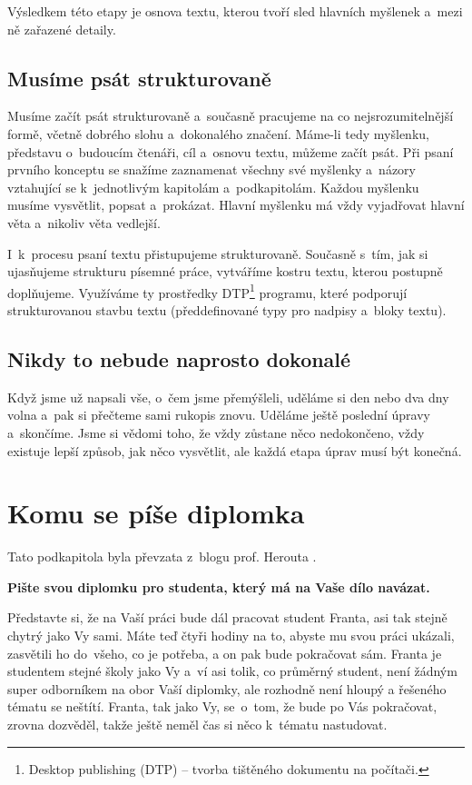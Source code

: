 Výsledkem této etapy je osnova textu, kterou tvoří sled hlavních myšlenek a~mezi ně zařazené detaily.

\subsection*{Musíme psát strukturovaně} 
Musíme začít psát strukturovaně a~současně pracujeme na co nejsrozumitelnější formě, včetně dobrého slohu a~dokonalého značení. 
Máme-li tedy myšlenku, představu o~budoucím čtenáři, cíl a~osnovu textu, můžeme začít psát. Při psaní prvního konceptu se snažíme zaznamenat všechny své myšlenky a~názory vztahující se k~jednotlivým kapitolám a~podkapitolám. Každou myšlenku musíme vysvětlit, popsat a~prokázat. Hlavní myšlenku má vždy vyjadřovat hlavní věta a~nikoliv věta vedlejší.

I~k~procesu psaní textu přistupujeme strukturovaně. Současně s~tím, jak si ujasňujeme strukturu písemné práce, vytváříme kostru textu, kterou postupně doplňujeme. Využíváme ty prostředky DTP\footnote{Desktop publishing (DTP) -- tvorba tištěného dokumentu na počítači.} programu, které podporují strukturovanou stavbu textu (předdefinované typy pro nadpisy a~bloky textu).

\subsection*{Nikdy to nebude naprosto dokonalé}
Když jsme už napsali vše, o~čem jsme přemýšleli, uděláme si den nebo dva dny volna a~pak si přečteme sami rukopis znovu. Uděláme ještě poslední úpravy a~skončíme. Jsme si vědomi toho, že vždy zůstane něco nedokončeno, vždy existuje lepší způsob, jak něco vysvětlit, ale každá etapa úprav musí být konečná.

\section{Komu se píše diplomka}
Tato podkapitola byla převzata z~blogu prof. Herouta \cite{Herout}.

\bigskip
\noindent \bf Pište svou diplomku pro studenta, který má na Vaše dílo navázat. \rm
\bigskip

Představte si, že na Vaší práci bude dál pracovat student Franta, asi tak stejně chytrý jako Vy sami. Máte teď čtyři hodiny na to, abyste mu svou práci ukázali, zasvětili ho do~všeho, co je potřeba, a on pak bude pokračovat sám. Franta je studentem stejné školy jako Vy a~ví asi tolik, co průměrný student, není žádným super odborníkem na obor Vaší diplomky, ale rozhodně není hloupý a řešeného tématu se neštítí. Franta, tak jako Vy, se~o~tom, že bude po Vás pokračovat, zrovna dozvěděl, takže ještě neměl čas si něco k~tématu nastudovat.

